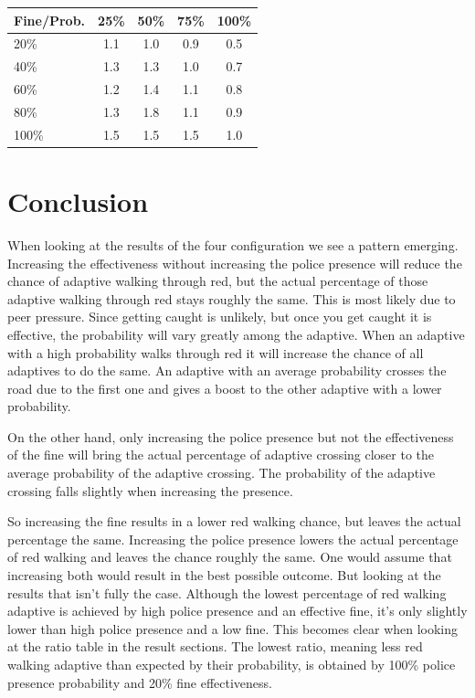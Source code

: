 \documentclass[a4paper]{article}
\begin{document}
\begin{table}[H]
\centering
\begin{tabular}{ l | c c c c }
  Fine\slash Prob. & 25\% & 50\% & 75\% & 100\% \\ 
  \hline
  20\%  & 1.1 & 1.0 & 0.9 & 0.5  \\
  40\%  & 1.3 & 1.3 & 1.0 & 0.7  \\
  60\%  & 1.2 & 1.4 & 1.1 & 0.8  \\
  80\%  & 1.3 & 1.8 & 1.1 & 0.9  \\
  100\% & 1.5 & 1.5 & 1.5 & 1.0  \\
\end{tabular}
\end{table}

\clearpage

\section{Conclusion}
When looking at the results of the four configuration we see a pattern emerging. Increasing the effectiveness without increasing the police presence will reduce the chance of adaptive walking through red, but the actual percentage of those adaptive walking through red stays roughly the same. This is most likely due to peer pressure. Since getting caught is unlikely, but once you get caught it is effective, the probability will vary greatly among the adaptive. When an adaptive with a high probability walks through red it will increase the chance of all adaptives to do the same. An adaptive with an average probability crosses the road due to the first one and gives a boost to the other adaptive with a lower probability.

On the other hand, only increasing the police presence but not the effectiveness of the fine will bring the actual percentage of adaptive crossing closer to the average probability of the adaptive crossing. The probability of the adaptive crossing falls slightly when increasing the presence.

So increasing the fine results in a lower red walking chance, but leaves the actual percentage the same. Increasing the police presence lowers the actual percentage of red walking and leaves the chance roughly the same. One would assume that increasing both would result in the best possible outcome. But looking at the results that isn't fully the case. Although the lowest percentage of red walking adaptive is achieved by high police presence and an effective fine, it's only slightly lower than high police presence and a low fine. This becomes clear when looking at the ratio table in the result sections. The lowest ratio, meaning less red walking adaptive than expected by their probability, is obtained by 100\% police presence probability and 20\% fine effectiveness.
\end{document}
